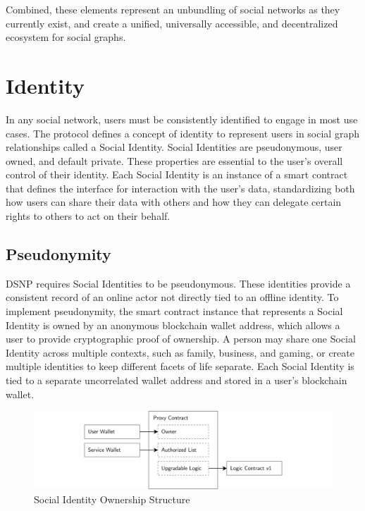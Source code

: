 \documentclass[12pt,letterpaper]{article}
\begin{document}
Combined, these elements represent an unbundling of social networks as they currently
exist, and create a unified, universally accessible, and decentralized ecosystem for
social graphs.

\section{Identity}\label{sec:identity}

In any social network, users must be consistently identified to engage in most use cases.
The protocol defines a concept of identity to represent users in social graph
relationships called a Social Identity. Social Identities are
pseudonymous,\cite{anon_terminology} user owned, and default private. These properties are
essential to the user's overall control of their identity. Each Social Identity is an
instance of a smart contract that defines the interface for interaction with the user's
data, standardizing both how users can share their data with others and how they can
delegate certain rights to others to act on their behalf.

\subsection{Pseudonymity}\label{sec:pseudonymity}

DSNP requires Social Identities to be pseudonymous. These identities provide a consistent
record of an online actor not directly tied to an offline identity. To implement
pseudonymity, the smart contract instance that represents a Social Identity is owned by an
anonymous blockchain wallet address, which allows a user to provide cryptographic proof of
ownership. A person may share one Social Identity across multiple contexts, such as
family, business, and gaming, or create multiple identities to keep different facets of
life separate. Each Social Identity is tied to a separate uncorrelated wallet address and
stored in a user's blockchain wallet.

\begin{figure}
	\includegraphics[width=\linewidth]{figures/Social Identity Ownership Structure.png}
	\caption{Social Identity Ownership Structure}
	\label{fig:1}
\end{figure}
\end{document}
